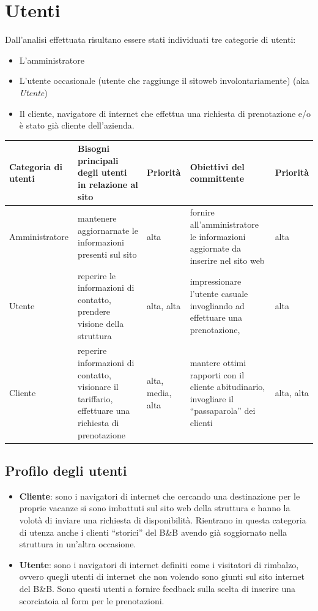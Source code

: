 \documentclass[a4paper,12pt,hidelinks]{report}
\begin{document}
\section{Utenti}
  Dall'analisi effettuata risultano essere stati individuati tre categorie di utenti:
  \begin{itemize}
    \item L'amministratore
    \item L'utente occasionale (utente che raggiunge il sitoweb involontariamente) (aka \textit{Utente})
    \item Il cliente, navigatore di internet che effettua una richiesta di prenotazione e/o è stato già cliente dell'azienda.
  \end{itemize}
  \begin{center}
    \begin{tabular}{||m{3cm}||m{4cm}|m{}||m{4cm}|m{}||}
      \hline
	\textbf{Categoria di utenti} & \textbf{Bisogni principali degli utenti in relazione al sito} & Priorità & \textbf{Obiettivi del committente} & Priorità \\
      \hline
	Amministratore & mantenere aggiornarnate le informazioni presenti sul sito & alta & fornire all'amministratore le informazioni aggiornate da inserire nel sito web & alta\\
      \hline
	Utente & reperire le informazioni di contatto, prendere visione della struttura
	      & alta, alta
	      & impressionare l'utente casuale invogliando ad effettuare una prenotazione,  & alta\\
      \hline  
	Cliente & reperire informazioni di contatto, visionare il tariffario, effettuare una richiesta di prenotazione & alta, media, alta & mantere ottimi rapporti con
	il cliente abitudinario, invogliare il ``passaparola'' dei clienti & alta, alta\\
      \hline
    \end{tabular}
  \end{center}
  \subsection{Profilo degli utenti}
    \begin{itemize}
    \item \textbf{Cliente}: sono i navigatori di internet che cercando una destinazione per le proprie vacanze si sono imbattuti sul sito web della struttura 
    e hanno la volotà di inviare una richiesta di disponibilità. 
    Rientrano in questa categoria di utenza anche i clienti ``storici'' del B\&B avendo già soggiornato nella struttura in un'altra occasione.
    \item \textbf{Utente}: sono i navigatori di internet definiti come i visitatori di rimbalzo, ovvero quegli utenti di internet che non volendo sono giunti sul sito 
    internet del B\&B. Sono questi utenti a fornire feedback sulla scelta di inserire una scorciatoia al form per le prenotazioni.
    \end{itemize}
\end{document}
